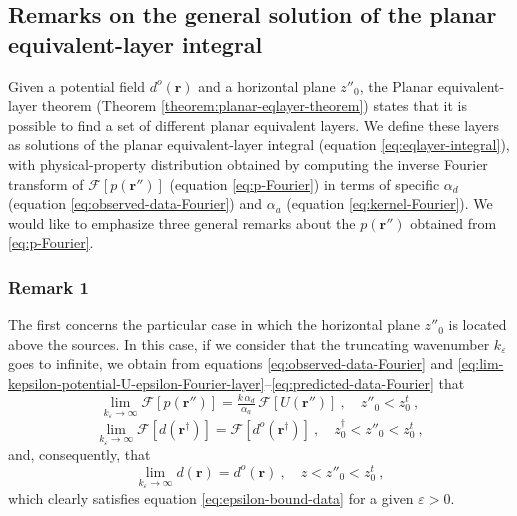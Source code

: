 \subsection{Remarks on the general solution of the planar equivalent-layer integral}

Given a potential field $d^{o}(\mathbf{r})$ and a horizontal plane $z''_{0}$, 
the Planar equivalent-layer theorem (Theorem \ref{theorem:planar-eqlayer-theorem}) states that 
it is possible to find a set of different planar equivalent layers.
We define these layers as solutions of the planar equivalent-layer integral (equation \ref{eq:eqlayer-integral}),
with physical-property distribution obtained by computing the inverse Fourier transform
of $\mathcal{F} [ p(\mathbf{r}'') ]$ (equation \ref{eq:p-Fourier}) in terms of specific 
$\alpha_{d}$ (equation \ref{eq:observed-data-Fourier})
and $\alpha_{a}$ (equation \ref{eq:kernel-Fourier}).
We would like to emphasize three general remarks about the $p(\mathbf{r}'')$ obtained from \ref{eq:p-Fourier}.

\subsubsection{Remark 1}

The first concerns the particular case in which the horizontal plane $z''_{0}$ is located above the sources.
In this case, if we consider that the truncating wavenumber $k_{\varepsilon}$ goes to infinite, 
we obtain from equations 
\ref{eq:observed-data-Fourier} and \ref{eq:lim-kepsilon-potential-U-epsilon-Fourier-layer}--\ref{eq:predicted-data-Fourier} that
\begin{equation}
	\lim_{k_{\varepsilon}\to\infty} \mathcal{F} \left[ p(\mathbf{r}'') \right] = 
	\tfrac{k \, \alpha_{d}}{\alpha_{a}} \,
	\mathcal{F} \left[ U(\mathbf{r}'') \right] \: , \quad z''_{0} < z^{t}_{0} \: ,
	\label{eq:lim-kepsilon-p-Fourier}
\end{equation}
\begin{equation}
	\lim_{k_{\varepsilon}\to\infty} \mathcal{F} \left[ d(\mathbf{r}^{\dagger}) \right] = 
	\mathcal{F} \left[ d^{o}(\mathbf{r}^{\dagger}) \right] \: , \quad z^{\dagger}_{0} < z''_{0} < z^{t}_{0} \: ,
	\label{eq:lim-kepsilon-predicted-data-Fourier}
\end{equation}
and, consequently, that
\begin{equation}
	\lim_{k_{\varepsilon}\to\infty} d(\mathbf{r}) = 
	d^{o}(\mathbf{r}) \: , \quad z < z''_{0} < z^{t}_{0} \: ,
	\label{eq:lim-kepsilon-predicted-data-space}
\end{equation}
which clearly satisfies equation \ref{eq:epsilon-bound-data} for a given $\varepsilon > 0$.


